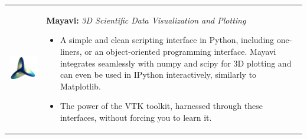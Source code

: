     \begin{center}
    \begin{tabularx}{\textwidth}{rX}
        \begin{minipage}{0.25\columnwidth}
            \begin{center}
            \includegraphics[width=6cm]{./images/mayavi.png}
            \end{center}
        \end{minipage}
        &
        \begin{minipage}{0.7\columnwidth}
            \textbf{Mayavi:} \textit{3D Scientific Data Visualization and Plotting}
            \vspace{0.5ex}

            \footnotesize{
                \begin{itemize}
                    \item A simple and clean scripting interface in Python, including one-liners, or an object-oriented programming interface. Mayavi integrates seamlessly with numpy and scipy for 3D plotting and can even be used in IPython interactively, similarly to Matplotlib.
                    \item The power of the VTK toolkit, harnessed through these interfaces, without forcing you to learn it.
                \end{itemize}

            }
        \end{minipage}
    \end{tabularx}
    \end{center}
